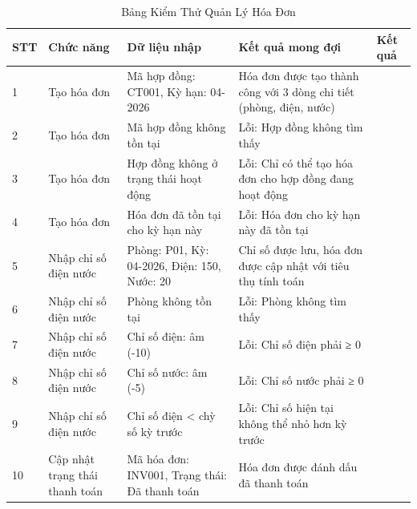\documentclass[12pt,a4paper]{article}
\begin{document}
\begin{table}[h!]
    \centering
    \caption{Bảng Kiểm Thử Quản Lý Hóa Đơn}
    \label{tab:invoice_management}
    \vspace{2mm}

    \begin{small}
    \begin{tabularx}{\textwidth}{|p{0.8cm}|p{2.5cm}|p{3cm}|p{3cm}|p{2.5cm}|}
    \hline
    \textbf{STT} & \textbf{Chức năng} & \textbf{Dữ liệu nhập} & \textbf{Kết quả mong đợi} & \textbf{Kết quả} \\ \hline

    1 & Tạo hóa đơn & Mã hợp đồng: CT001, Kỳ hạn: 04-2026 & Hóa đơn được tạo thành công với 3 dòng chi tiết (phòng, điện, nước) & \\ \hline

    2 & Tạo hóa đơn & Mã hợp đồng không tồn tại & Lỗi: Hợp đồng không tìm thấy & \\ \hline

    3 & Tạo hóa đơn & Hợp đồng không ở trạng thái hoạt động & Lỗi: Chỉ có thể tạo hóa đơn cho hợp đồng đang hoạt động & \\ \hline

    4 & Tạo hóa đơn & Hóa đơn đã tồn tại cho kỳ hạn này & Lỗi: Hóa đơn cho kỳ hạn này đã tồn tại & \\ \hline

    5 & Nhập chỉ số điện nước & Phòng: P01, Kỳ: 04-2026, Điện: 150, Nước: 20 & Chỉ số được lưu, hóa đơn được cập nhật với tiêu thụ tính toán & \\ \hline

    6 & Nhập chỉ số điện nước & Phòng không tồn tại & Lỗi: Phòng không tìm thấy & \\ \hline

    7 & Nhập chỉ số điện nước & Chỉ số điện: âm (-10) & Lỗi: Chỉ số điện phải ≥ 0 & \\ \hline

    8 & Nhập chỉ số điện nước & Chỉ số nước: âm (-5) & Lỗi: Chỉ số nước phải ≥ 0 & \\ \hline

    9 & Nhập chỉ số điện nước & Chỉ số điện < chỳ số kỳ trước & Lỗi: Chỉ số hiện tại không thể nhỏ hơn kỳ trước & \\ \hline

    10 & Cập nhật trạng thái thanh toán & Mã hóa đơn: INV001, Trạng thái: Đã thanh toán & Hóa đơn được đánh dấu đã thanh toán & \\ \hline


\end{tabularx}
\end{small}
\end{table}
\end{document}

